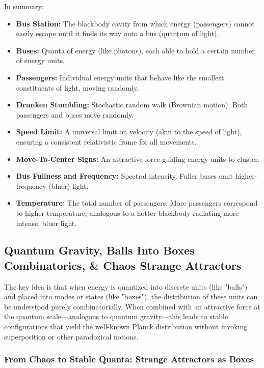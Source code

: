 \documentclass{article}
\begin{document}
In summary:
\begin{itemize}
    \item \textbf{Bus Station:} The blackbody cavity from which energy (passengers) cannot easily escape until it finds its way onto a bus (quantum of light).
    \item \textbf{Buses:} Quanta of energy (like photons), each able to hold a certain number of energy units.
    \item \textbf{Passengers:} Individual energy units that behave like the smallest constituents of light, moving randomly.
    \item \textbf{Drunken Stumbling:} Stochastic random walk (Brownian motion). Both passengers and buses move randomly.
    \item \textbf{Speed Limit:} A universal limit on velocity (akin to the speed of light), ensuring a consistent relativistic frame for all movements.
    \item \textbf{Move-To-Center Signs:} An attractive force guiding energy units to cluster.
    \item \textbf{Bus Fullness and Frequency:} Spectral intensity. Fuller buses emit higher-frequency (bluer) light.
    \item \textbf{Temperature:} The total number of passengers. More passengers correspond to higher temperature, analogous to a hotter blackbody radiating more intense, bluer light.
\end{itemize}


\subsection*{Quantum Gravity, Balls Into Boxes Combinatorics, \& Chaos Strange Attractors}

The key idea is that when energy is quantized into discrete units (like "balls") and placed into modes or states (like "boxes"), the distribution of these units can be understood purely combinatorially. When combined with an attractive force at the quantum scale—analogous to quantum gravity—this leads to stable configurations that yield the well-known Planck distribution without invoking superposition or other paradoxical notions.

\subsubsection*{From Chaos to Stable Quanta: Strange Attractors as Boxes}
\end{document}
